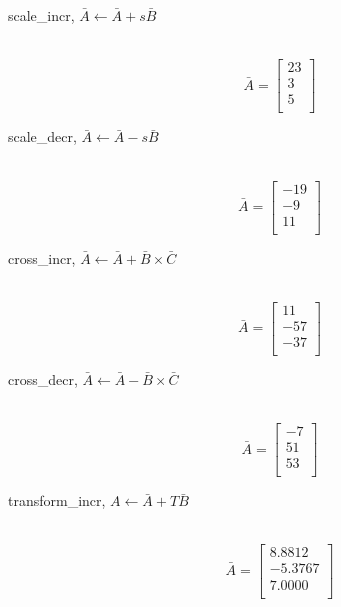 \begin{description}
  \item[scale\_incr, $\bar{A} \leftarrow \bar{A}+s\bar{B}$]\ \newline
   \begin{equation}\nonumber
   \bar{A} = \left[
   \begin{array}{r}
      23  \\
       3  \\
       5  \\
   \end{array}\right]
   \end{equation}

  \item[scale\_decr, $\bar{A} \leftarrow \bar{A}-s\bar{B}$]\ \newline
   \begin{equation}\nonumber
   \bar{A} = \left[
   \begin{array}{r}
     -19  \\
      -9  \\
      11  \\
   \end{array}\right]
   \end{equation}

  \item[cross\_incr, $\bar{A} \leftarrow \bar{A} + \bar{B}\times\bar{C}$]\ \newline
   \begin{equation}\nonumber
   \bar{A} = \left[
   \begin{array}{r}
      11  \\
     -57  \\
     -37  \\
   \end{array}\right]
   \end{equation}

  \item[cross\_decr, $\bar{A} \leftarrow \bar{A} - \bar{B}\times\bar{C}$]\ \newline
   \begin{equation}\nonumber
   \bar{A} = \left[
   \begin{array}{r}
      -7  \\
      51  \\
      53  \\
   \end{array}\right]
   \end{equation}

  \item[transform\_incr, $A\leftarrow\bar{A}+T\bar{B}$]\ \newline
   \begin{equation}\nonumber
   \bar{A} = \left[
   \begin{array}{r}
      8.8812 \\
     -5.3767 \\
      7.0000 \\
   \end{array}\right]
   \end{equation}


\end{description}
